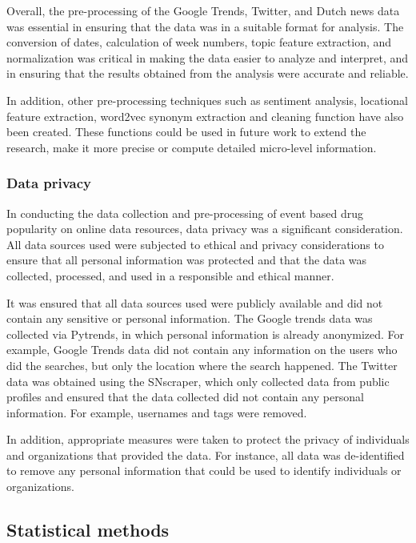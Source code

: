 \noindent Overall, the pre-processing of the Google Trends,
Twitter, and Dutch news data was essential in ensuring that the
data was in a suitable format for analysis. The conversion of
dates, calculation of week numbers, topic feature extraction,
and normalization was critical in making the data easier to
analyze and interpret, and in ensuring that the results obtained
from the analysis were accurate and reliable.

In addition, other pre-processing techniques such as sentiment
analysis, locational feature extraction, word2vec synonym
extraction and cleaning function have also been created. These
functions could be used in future work to extend the research,
make it more precise or compute detailed micro-level information.

\subsubsection{Data privacy}

In conducting the data collection and pre-processing of event
based drug popularity on online data resources, data privacy was
a significant consideration. All data sources used were
subjected to ethical and privacy considerations to ensure that
all personal information was protected and that the data was
collected, processed, and used in a responsible and ethical
manner.

It was ensured that all data sources used were publicly
available and did not contain any sensitive or personal
information. The Google trends data was collected via Pytrends,
in which personal information is already anonymized. For
example, Google Trends data did not contain any information on
the users who did the searches, but only the location where the
search happened. The Twitter data was obtained using the
SNscraper, which only collected data from public profiles and
ensured that the data collected did not contain any personal
information. For example, usernames and tags were removed.

In addition, appropriate measures were taken to protect the
privacy of individuals and organizations that provided the data.
For instance, all data was de-identified to remove any personal
information that could be used to identify individuals or
organizations.

\subsection {Statistical methods}

